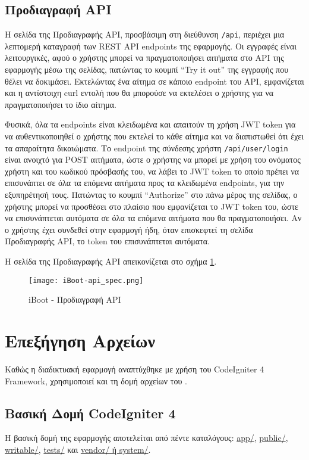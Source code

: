 \subsection{Προδιαγραφή API}
\FloatBarrier
Η σελίδα της Προδιαγραφής API, προσβάσιμη στη διεύθυνση \verb!/api!, περιέχει μια λεπτομερή καταγραφή των REST API endpoints της εφαρμογής. Οι εγγραφές είναι λειτουργικές, αφού ο χρήστης μπορεί να πραγματοποιήσει αιτήματα στο API της εφαρμογής μέσω της σελίδας, πατώντας το κουμπί ``Try it out'' της εγγραφής που θέλει να δοκιμάσει. Εκτελώντας ένα αίτημα σε κάποιο endpoint του API, εμφανίζεται και η αντίστοιχη curl εντολή που θα μπορούσε να εκτελέσει ο χρήστης για να πραγματοποιήσει το ίδιο αίτημα.

Φυσικά, όλα τα endpoints είναι κλειδωμένα και απαιτούν τη χρήση JWT token για να αυθεντικοποιηθεί ο χρήστης που εκτελεί το κάθε αίτημα και να διαπιστωθεί ότι έχει τα απαραίτητα δικαιώματα. Το endpoint της σύνδεσης χρήστη \verb!/api/user/login! είναι ανοιχτό για POST αιτήματα, ώστε ο χρήστης να μπορεί με χρήση του ονόματος χρήστη και του κωδικού πρόσβασής του, να λάβει το JWT token το οποίο πρέπει να επισυνάπτει σε όλα τα επόμενα αιτήματα προς τα κλειδωμένα endpoints, για την εξυπηρέτησή τους. Πατώντας το κουμπί ``Authorize'' στο πάνω μέρος της σελίδας, ο χρήστης μπορεί να προσθέσει στο πλαίσιο που εμφανίζεται το JWT token του, ώστε να επισυνάπτεται αυτόματα σε όλα τα επόμενα αιτήματα που θα πραγματοποιήσει. Αν ο χρήστης έχει συνδεθεί στην εφαρμογή ήδη, όταν επισκεφτεί τη σελίδα Προδιαγραφής API, το token του επισυνάπτεται αυτόματα.

Η σελίδα της Προδιαγραφής API απεικονίζεται στο σχήμα \ref{fig:iBoot_api_spec}.
\begin{figure}[ht]
	\centering
	\texttt{[image: iBoot-api\_spec.png]}
	\caption{iBoot - Προδιαγραφή API}
	\label{fig:iBoot_api_spec}
\end{figure}
\FloatBarrier

\section{Επεξήγηση Αρχείων}
Καθώς η διαδικτυακή εφαρμογή αναπτύχθηκε με χρήση του CodeIgniter 4 Framework, χρησιμοποιεί και τη δομή αρχείων του \cite{CodeIgniter_structure}.

\subsection{Βασική Δομή CodeIgniter 4}
Η βασική δομή της εφαρμογής αποτελείται από πέντε καταλόγους: \hyperref[ui:app]{app/}, \hyperref[ui:public]{public/}, \hyperref[ui:writable]{writable/}, \hyperref[ui:tests]{tests/} και \hyperref[ui:system]{vendor/ ή system/}.

